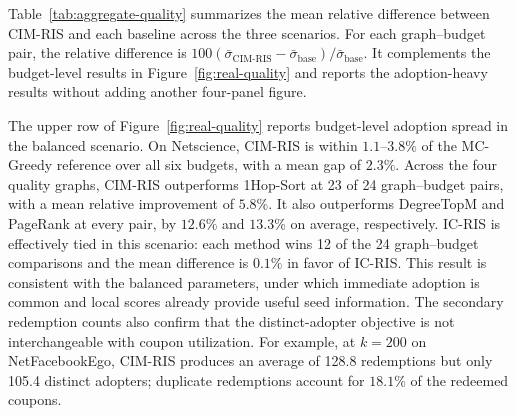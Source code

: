 \documentclass[sigconf,balance=false]{acmart}
\newcommand{\CIMRIS}{\textsc{CIM-RIS}}
\begin{document}
Table~\ref{tab:aggregate-quality} summarizes the mean relative difference
between \CIMRIS{} and each baseline across the three scenarios. For each
graph--budget pair, the relative difference is
$100(\bar{\sigma}_{\mathrm{CIM\text{-}RIS}}-
\bar{\sigma}_{\mathrm{base}})/\bar{\sigma}_{\mathrm{base}}$.
It complements the budget-level results in
Figure~\ref{fig:real-quality} and reports
the adoption-heavy results without adding another four-panel figure.

\begin{table}[t]
  \caption{Mean relative adoption-spread difference (\%) between
  \CIMRIS{} and each baseline. Positive values favor \CIMRIS{}.
  Baseline comparisons average 24 graph--budget pairs per scenario;
  MC-Greedy averages the six Netscience budgets.}
  \label{tab:aggregate-quality}
  \centering
\end{table}

The upper row of Figure~\ref{fig:real-quality} reports budget-level adoption
spread in the balanced scenario.
On Netscience, \CIMRIS{} is within $1.1$--$3.8\%$ of the MC-Greedy
reference over all six budgets, with a mean gap of $2.3\%$.
Across the four quality graphs, \CIMRIS{} outperforms 1Hop-Sort at 23 of
24 graph--budget pairs, with a mean relative improvement of $5.8\%$.
It also outperforms DegreeTopM and PageRank at every pair, by $12.6\%$
and $13.3\%$ on average, respectively.
IC-RIS is effectively tied in this scenario: each method wins 12 of the
24 graph--budget comparisons and the mean difference is $0.1\%$ in favor
of IC-RIS.
This result is consistent with the balanced parameters, under which
immediate adoption is common and local scores already provide useful
seed information.
The secondary redemption counts also confirm that the distinct-adopter
objective is not interchangeable with coupon utilization.
For example, at $k=200$ on NetFacebookEgo, \CIMRIS{} produces an average
of 128.8 redemptions but only 105.4 distinct adopters; duplicate
redemptions account for $18.1\%$ of the redeemed coupons.
\end{document}
